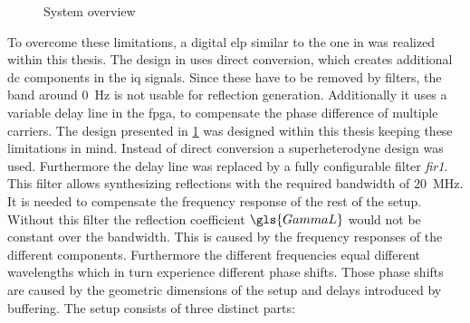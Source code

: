 \documentclass[12pt,a4paper,parskip=full,abstract=true,BCOR=12mm,twoside,open=right]{scrreprt}
\def\device#1{\textit{#1}}
\begin{document}
\begin{figure}[htb]
{
    }
    \caption{System overview}
    \label{fig:overall_hf}
\end{figure}

To overcome these limitations, a digital \gls{elp} similar to the one in
\cite{hashim_active_2008} was realized within this thesis. The design in \cite{hashim_active_2008}
uses direct conversion, which creates additional \gls{dc} components in the \gls{iq}
signals. Since these have to be removed by filters, the band around \SI{0}{\hertz} is
not usable for reflection generation. Additionally it uses a variable delay line in
the \gls{fpga}, to compensate the phase difference of multiple carriers. The design presented in
\cref{fig:overall_hf} was designed within this thesis keeping these limitations in mind. Instead of direct
conversion a superheterodyne design was used. Furthermore the delay line was replaced by
a fully configurable filter \device{fir1}. This filter allows synthesizing reflections with the required bandwidth
of \SI{20}{\mega\hertz}. It is needed to compensate the frequency response of the rest of the setup.
Without this filter the reflection coefficient $\gls{GammaL}$ would not be constant over the bandwidth. This
is caused by the frequency responses of the different components. Furthermore the different frequencies
equal different wavelengths which in turn experience different phase shifts. Those phase shifts are caused by the geometric
dimensions of the setup and delays introduced by buffering.
The setup consists of three distinct parts:
\end{document}

